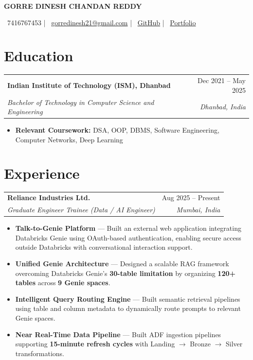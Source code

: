 \documentclass[a4paper,10pt]{article}
\makeatletter
\newcommand{\resumeItem}[1]{\item\small{#1}}
\newcommand{\resumeSubheading}[4]{\begin{tabular*}{\textwidth}{l@{\extracolsep{\fill}}r}{\Large\textbf{#1}} & #2 \\ \textit{#3} & \textit{#4}\end{tabular*}\vspace{2pt}}
\newcommand{\resumeItemListStart}{\begin{itemize}[leftmargin=0.18in,itemsep=1pt,topsep=1pt]}
\newcommand{\resumeItemListEnd}{\end{itemize}\vspace{1pt}}
\makeatother
\begin{document}
\begin{center}

{\Huge\textbf{GORRE DINESH CHANDAN REDDY}}

\vspace{6pt}

\small
\faPhone\ 7416767453
\quad | \quad
\faEnvelope\ \href{mailto:gorredinesh21@gmail.com}{gorredinesh21@gmail.com}
\quad | \quad
\faGithub\ \href{https://github.com/gorredinesh21}{GitHub}
\quad | \quad
\faGlobe\ \href{https://portfolio-eight-coral-tabh47k4e7.vercel.app/}{Portfolio}

\end{center}

\vspace{-3pt}

\section{Education}

\resumeSubheading
{Indian Institute of Technology (ISM), Dhanbad}
{Dec 2021 -- May 2025}
{Bachelor of Technology in Computer Science and Engineering}
{Dhanbad, India}
\resumeItemListStart
\resumeItem{
\textbf{Relevant Coursework:} DSA, OOP, DBMS, Software Engineering, Computer Networks, Deep Learning
}
\resumeItemListEnd

\section{Experience}

\resumeSubheading
{Reliance Industries Ltd.}
{Aug 2025 -- Present}
{Graduate Engineer Trainee (Data / AI Engineer)}
{Mumbai, India}
\resumeItemListStart
\resumeItem{
\textbf{Talk-to-Genie Platform} --- Built an external web application integrating Databricks Genie using OAuth-based authentication, enabling secure access outside Databricks with conversational interaction support.
}
\resumeItem{
\textbf{Unified Genie Architecture} --- Designed a scalable RAG framework overcoming Databricks Genie's \textbf{30-table limitation} by organizing \textbf{120+ tables} across \textbf{9 Genie spaces}.
}
\resumeItem{
\textbf{Intelligent Query Routing Engine} --- Built semantic retrieval pipelines using table and column metadata to dynamically route prompts to relevant Genie spaces.
}
\resumeItem{
\textbf{Near Real-Time Data Pipeline} --- Built ADF ingestion pipelines supporting \textbf{15-minute refresh cycles} with Landing $\rightarrow$ Bronze $\rightarrow$ Silver transformations.
}
\resumeItemListEnd
\end{document}
